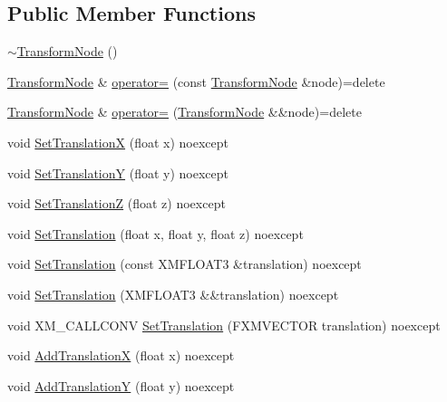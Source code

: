 \subsection*{Public Member Functions}
\begin{DoxyCompactItemize}
\item 
\hyperlink{structmage_1_1_transform_node_a0c5e84d99c27cda31dae8106611d682f}{$\sim$\+Transform\+Node} ()
\item 
\hyperlink{structmage_1_1_transform_node}{Transform\+Node} \& \hyperlink{structmage_1_1_transform_node_afd5f7d7b377b1a85cbe1d64f8f0df49a}{operator=} (const \hyperlink{structmage_1_1_transform_node}{Transform\+Node} \&node)=delete
\item 
\hyperlink{structmage_1_1_transform_node}{Transform\+Node} \& \hyperlink{structmage_1_1_transform_node_a8dcd5a36ad95917216df628d309b294d}{operator=} (\hyperlink{structmage_1_1_transform_node}{Transform\+Node} \&\&node)=delete
\item 
void \hyperlink{structmage_1_1_transform_node_ae56c297f2c7645d853e75e095ea7fedf}{Set\+TranslationX} (float x) noexcept
\item 
void \hyperlink{structmage_1_1_transform_node_a323420dba6c3c925cef64c6c94b941c3}{Set\+TranslationY} (float y) noexcept
\item 
void \hyperlink{structmage_1_1_transform_node_a7fd65c2bbcb4e94150cda44e7adb240d}{Set\+TranslationZ} (float z) noexcept
\item 
void \hyperlink{structmage_1_1_transform_node_a5cb84130381c984174ccefdcf65a62c6}{Set\+Translation} (float x, float y, float z) noexcept
\item 
void \hyperlink{structmage_1_1_transform_node_ae418bb44c86394c1590c7c6d6735027a}{Set\+Translation} (const X\+M\+F\+L\+O\+A\+T3 \&translation) noexcept
\item 
void \hyperlink{structmage_1_1_transform_node_af62e3d540778f236ba7b2fd914d369a6}{Set\+Translation} (X\+M\+F\+L\+O\+A\+T3 \&\&translation) noexcept
\item 
void X\+M\+\_\+\+C\+A\+L\+L\+C\+O\+NV \hyperlink{structmage_1_1_transform_node_a958f614a6a534d26ac1d3eab3bea5ccb}{Set\+Translation} (F\+X\+M\+V\+E\+C\+T\+OR translation) noexcept
\item 
void \hyperlink{structmage_1_1_transform_node_ac9c30d9a64385e744efdb4e222075d20}{Add\+TranslationX} (float x) noexcept
\item 
void \hyperlink{structmage_1_1_transform_node_a1ca03ded81979a9b550abd0448312145}{Add\+TranslationY} (float y) noexcept
\item 

\end{DoxyCompactItemize}

